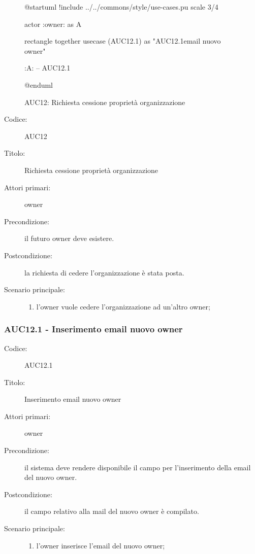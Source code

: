 \documentclass[../../../analisi-dei-requisiti.tex]{subfiles}
\begin{document}
\begin{figure}[h!]
  \centering
  \begin{plantuml}
  @startuml
  !include ../../commons/style/use-cases.pu
  scale 3/4

  actor :owner: as A

  rectangle {
    together {
      usecase (AUC12.1) as "AUC12.1\nInserimento email nuovo owner"
    }
  }

  :A: -- AUC12.1

  @enduml
  \end{plantuml}
  \caption{AUC12: Richiesta cessione proprietà organizzazione}
  \label{fig:auc12}
\end{figure}

\begin{description}
  \item[Codice:] AUC12
  \item[Titolo:] Richiesta cessione proprietà organizzazione
  \item[Attori primari:] owner
  \item[Precondizione:] il futuro owner deve esistere.
  \item[Postcondizione:] la richiesta di cedere l'organizzazione è stata posta.
  \item[Scenario principale:]
  \begin{enumerate}
    \item l'owner vuole cedere l'organizzazione ad un'altro owner;
  \end{enumerate}
\end{description}

\subsubsection{AUC12.1 - Inserimento email nuovo owner}%
\label{subsub:AUC12.1}
\begin{description}
  \item[Codice:] AUC12.1
  \item[Titolo:] Inserimento email nuovo owner
  \item[Attori primari:] owner
  \item[Precondizione:] il sistema deve rendere disponibile il campo per l'inserimento della email del nuovo owner.
  \item[Postcondizione:] il campo relativo alla mail del nuovo owner è compilato.
  \item[Scenario principale:]
  \begin{enumerate}
    \item l'owner inserisce l'email del nuovo owner;
  \end{enumerate}
\end{description}
\end{document}
